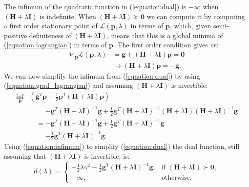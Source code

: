 \documentclass[letterpaper,12pt,titlepage,oneside,final]{book}
\begin{document}
	The infimum of the quadratic function in (\ref{equation:dual}) is $-\infty$ when $(\mathbf{H} + \lambda\mathbf{I})$ is indefinite. When $(\mathbf{H} + \lambda\mathbf{I}) \succeq \mathbf{0}$ we can compute it by computing a first order stationary point of $\mathcal{L}(\mathbf{p},\lambda)$ in terms of $\mathbf{p}$, which, given semi-positive definiteness of $(\mathbf{H} + \lambda\mathbf{I})$, means that this is a global minima of (\ref{equation:lagrangian}) in terms of $\mathbf{p}$. The first order condition gives us:
	\begin{equation}
	\begin{aligned}
	\nabla_{\mathbf{p}} \mathcal{L}(\mathbf{p},\lambda) & = \mathbf{g} + (\mathbf{H} + \lambda\mathbf{I}) \mathbf{p} = \mathbf{0} \\
	& \rightarrow (\mathbf{H} + \lambda\mathbf{I})\mathbf{p} = -\mathbf{g}.
	\end{aligned}
	\label{equation:grad_lagrangian}
	\end{equation}
	We can now simplify the infimum from (\ref{equation:dual}) by using (\ref{equation:grad_lagrangian}) and assuming $(\mathbf{H} + \lambda \mathbf{I})$ is invertible:
	\begin{equation}
	\begin{aligned}
	\underset{\mathbf{p}}{\inf}
	&(\mathbf{g}^{T}\mathbf{p} + \frac{1}{2}\mathbf{p}^{T}(\mathbf{H} + \lambda\mathbf{I})\mathbf{p}) \\ & \quad = -\mathbf{g}^{T}(\mathbf{H} + \lambda\mathbf{I})^{-1}\mathbf{g} + \frac{1}{2}\mathbf{g}^{T}(\mathbf{H} + \lambda\mathbf{I})^{-1}(\mathbf{H} + \lambda\mathbf{I})(\mathbf{H} + \lambda\mathbf{I})^{-1}\mathbf{g}   \\
	& \quad = -\mathbf{g}^{T}(\mathbf{H} + \lambda\mathbf{I})^{-1}\mathbf{g} + \frac{1}{2}\mathbf{g}^{T}(\mathbf{H} + \lambda\mathbf{I})^{-1}\mathbf{g} \\
	& \quad = - \frac{1}{2}\mathbf{g}^{T}(\mathbf{H} + \lambda\mathbf{I})^{-1}\mathbf{g}.
	\end{aligned}
	\label{equation:infimum}
	\end{equation}
	 Using (\ref{equation:infimum}) to simplify (\ref{equation:dual}) the dual function, still assuming that $(\mathbf{H} + \lambda\mathbf{I})$ is invertible, is:
	\begin{equation}
	d(\lambda)= 
	\begin{cases}
	-\frac{1}{2}\lambda\gamma^{2} - \frac{1}{2}\mathbf{g}^{T}(\mathbf{H} + \lambda\mathbf{I})^{-1}\mathbf{g} ,& \text{if } (\mathbf{H} + \lambda\mathbf{I}) \succ \mathbf{0},\\
	-\infty,              & \text{otherwise}.
	\end{cases}
	\label{equation:g_fun}
	\end{equation}
\end{document}
